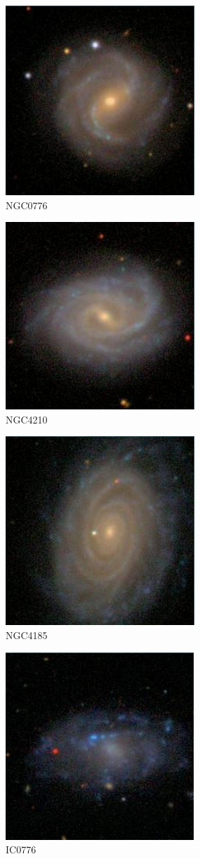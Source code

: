 \documentclass[9pt]{revtex4-1}
\begin{document}
\begin{figure}
\includegraphics[scale=0.3]{NGC0776.png}
\caption{NGC0776}
\end{figure}
\begin{figure}
\includegraphics[scale=0.3]{NGC4210.png}
\caption{NGC4210}
\end{figure}
\begin{figure}
\includegraphics[scale=0.3]{NGC4185.png}
\caption{NGC4185}
\end{figure}
\begin{figure}
\includegraphics[scale=0.3]{IC0776.png}
\caption{IC0776}
\end{figure}
\end{document}
